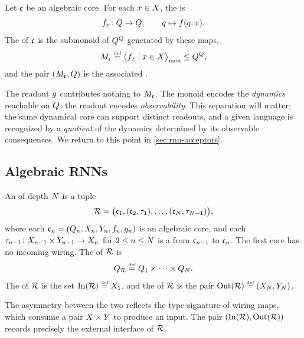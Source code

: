 \documentclass{article}
\begin{document}
\begin{definition}\label{def:transition-monoid}
Let $\mathfrak{c}$ be an algebraic core. For each $x \in X$, the  is
$$
f_x \colon Q \to Q, \qquad q \mapsto f(q, x).
$$
The  of $\mathfrak{c}$ is the submonoid of $Q^Q$ generated by these maps,
$$
M_{\mathfrak{c}} \mathrel{\stackrel{\textnormal{\tiny def}}{=}} \bigl\langle f_x \mid x \in X \bigr\rangle_{\mathrm{mon}} \leq Q^Q,
$$
and the pair $(M_{\mathfrak{c}}, Q)$ is the associated .
\end{definition}

\begin{remark}\label{rem:dyn-vs-obs}
The readout $g$ contributes nothing to $M_{\mathfrak{c}}$. 
The monoid encodes the \emph{dynamics} reachable on $Q$; the readout encodes \emph{observability}. 
This separation will matter: the same dynamical core can support distinct readouts, and a given language is recognized by a \emph{quotient} of the dynamics determined by its observable consequences. 
We return to this point in \cref{sec:rnn-acceptors}.
\end{remark}

\subsection{Algebraic RNNs}\label{sec:algebraic-rnns-def}

\begin{definition}\label{def:algebraic-rnn}
An  of depth $N$ is a tuple
$$ \mathcal{R} = \bigl(  \mathfrak{c}_1,  (\mathfrak{c}_2, \tau_1),  \ldots,  (\mathfrak{c}_N, \tau_{N-1})  \bigr), $$
where each $\mathfrak{c}_n = (Q_n, X_n, Y_n, f_n, g_n)$ is an algebraic core, and each $\tau_{n-1} \colon X_{n-1} \times Y_{n-1} \to X_n$ for $2 \leq n \leq N$ is a  from $\mathfrak{c}_{n-1}$ to $\mathfrak{c}_n$. 
The first core has no incoming wiring.  
The  of $\mathcal{R}$ is
$$ Q_{\mathcal{R}} \mathrel{\stackrel{\textnormal{\tiny def}}{=}} Q_1 \times \cdots \times Q_N. $$
The  of $\mathcal{R}$ is the set $\mathrm{In}(\mathcal{R}) \mathrel{\stackrel{\textnormal{\tiny def}}{=}} X_1$, and the  of $\mathcal{R}$ is the pair $\mathrm{Out}(\mathcal{R}) \mathrel{\stackrel{\textnormal{\tiny def}}{=}} (X_N, Y_N)$. 
\end{definition}
The asymmetry between the two reflects the type-signature of wiring maps, which consume a pair $X \times Y$ to produce an input. 
The pair $(\mathrm{In}(\mathcal{R}), \mathrm{Out}(\mathcal{R}))$ records precisely the external interface of $\mathcal{R}$. 
\end{document}
